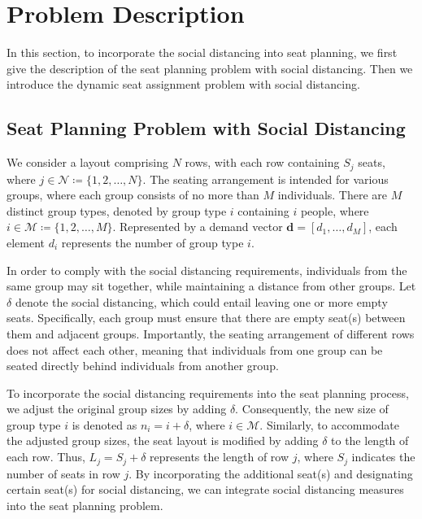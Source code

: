 \section{Problem Description}
In this section, to incorporate the social distancing into seat planning, we first give the description of the seat planning problem with social distancing. Then we introduce the dynamic seat assignment problem with social distancing.


\subsection{Seat Planning Problem with Social Distancing}\label{dynamic_demand}
We consider a layout comprising $N$ rows, with each row containing $S_j$ seats, where $j \in \mathcal{N} \coloneqq \{1,2, \ldots, N\}$. The seating arrangement is intended for various groups, where each group consists of no more than $M$ individuals. There are $M$ distinct group types, denoted by group type $i$ containing $i$ people, where $i \in \mathcal{M} \coloneqq \{1,2, \ldots, M\}$. Represented by a demand vector $\mathbf{d} = [d_1, \ldots, d_M]$, each element $d_i$ represents the number of group type $i$.


In order to comply with the social distancing requirements, individuals from the same group may sit together, while maintaining a distance from other groups. Let $\delta$ denote the social distancing, which could entail leaving one or more empty seats. Specifically, each group must ensure that there are empty seat(s) between them and adjacent groups. Importantly, the seating arrangement of different rows does not affect each other, meaning that individuals from one group can be seated directly behind individuals from another group.

To incorporate the social distancing requirements into the seat planning process, we adjust the original group sizes by adding $\delta$. Consequently, the new size of group type $i$ is denoted as $n_i = i + \delta$, where $i \in \mathcal{M}$. Similarly, to accommodate the adjusted group sizes, the seat layout is modified by adding $\delta$ to the length of each row. Thus, $L_j = S_j + \delta$ represents the length of row $j$, where $S_j$ indicates the number of seats in row $j$. By incorporating the additional seat(s) and designating certain seat(s) for social distancing, we can integrate social distancing measures into the seat planning problem.

